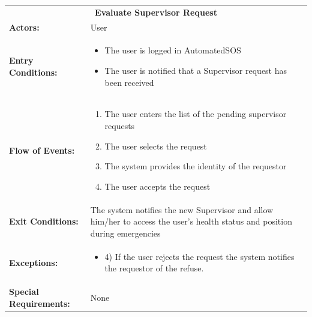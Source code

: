 \begin{table}[htb]
	\centering
	{\renewcommand{\arraystretch}{1.5}%
		\begin{tabular}{|@{\hspace{2em}} p{4cm} @{}| p{11cm} @{\qquad}|}
			\cline{1-2}
			\multicolumn{2}{|c|}{\textbf{Evaluate Supervisor Request}} \\ \cline{1-2}
			\textbf{Actors:} & User \\ \cline{1-2}
			\textbf{Entry Conditions:} & \begin{itemize}[topsep=0em, itemsep=-0.2em]
				\item The user is logged in AutomatedSOS
				\item The user is notified that a Supervisor request has been received
			\end{itemize} \\ \cline{1-2}
			\textbf{Flow of Events:} & \begin{enumerate}[topsep=0em, itemsep=-0.2em]
				\item The user enters the list of the pending supervisor requests
				\item The user selects the request
				\item The system provides the identity of the requestor
				\item The user accepts the request
			\end{enumerate}\\ \cline{1-2}
			\textbf{Exit Conditions:} & The system notifies the new Supervisor and allow him/her to access the user's health status and position during emergencies  \\ \cline{1-2}
			\textbf{Exceptions:} & \begin{itemize}
				\item 4) If the user rejects the request the system notifies the requestor of the refuse.
			\end{itemize} \\ \cline{1-2}
			\textbf{Special Requirements:} & None \\ \cline{1-2}
	\end{tabular}} \quad
\end{table}

